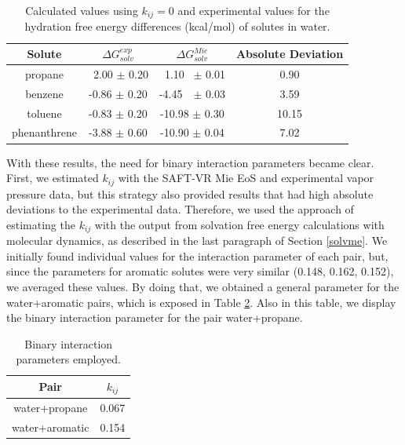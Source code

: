 \begin{table}[h]
	\centering
	\caption{Calculated values using $k_{ij}=0$ and experimental values for the hydration free energy differences (kcal/mol) of solutes in water.}
	\label{tbl:solv3}
	\begin{tabular}{cccc}
		\hline\hline
		Solute       & $\Delta G_{solv}^{exp}$ & $\Delta G_{solv}^{Mie}$ & Absolute Deviation \\ \hline\hline
		propane      & $\,$ 2.00 $\pm$ 0.20         & $\,$ 1.10 $\,$ $\pm$ 0.01         & 0.90               \\
		benzene      & -0.86 $\pm$ 0.20        & -4.45 $\, \,$ $\pm$ 0.03        & 3.59               \\
		toluene      & -0.83 $\pm$ 0.20        & -10.98 $\pm$ 0.30       & 10.15              \\
		phenanthrene & -3.88 $\pm$ 0.60        & -10.90 $\pm$ 0.04       & 7.02               \\ \hline\hline
	\end{tabular}
\end{table}
\FloatBarrier

With these results, the need for binary interaction parameters became clear. First, we estimated $k_{ij}$ with the SAFT-VR Mie EoS and experimental vapor pressure data, but this strategy also provided results that had high absolute deviations to the experimental data. Therefore, we used the approach of estimating the $k_{ij}$ with the output from solvation free energy calculations with molecular dynamics, as described in the last paragraph of Section \ref{solvme}.  We initially found individual values for the interaction parameter of each pair, but, since the parameters for aromatic solutes were very similar (0.148, 0.162, 0.152), we averaged these values. By doing that,  we obtained a general parameter for the water+aromatic pairs, which is exposed in Table \ref{tbl:kij}. Also in this table, we display the binary interaction parameter for the pair water+propane. 

\begin{table}[h]
	\centering
	\caption{Binary interaction parameters employed.}
	\label{tbl:kij}
	\begin{tabular}{cc}
		\hline
		\hline
		Pair & $k_{ij}$ \\
		\hline\hline
		water+propane      & 0.067  \\
		water+aromatic      & 0.154 \\  
		\hline
		\hline
	\end{tabular}
\end{table}

